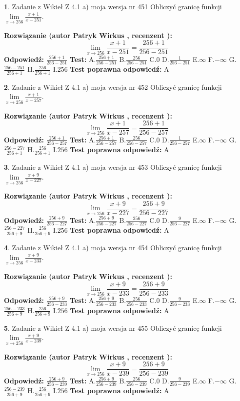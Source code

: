 \documentclass[12pt, a4paper]{article}
\theoremstyle{definition} %
\newtheorem{zad}{}
\newcommand{\zadStart}[1]{\begin{zad}#1\newline}
\newcommand{\zadStop}{\end{zad}}
\newcommand{\rozwStart}[2]{\noindent \textbf{Rozwiązanie (autor #1 , recenzent #2): }\newline}
\newcommand{\rozwStop}{\newline}
\newcommand{\odpStart}{\noindent \textbf{Odpowiedź:}\newline}
\newcommand{\odpStop}{\newline}
\newcommand{\testStart}{\noindent \textbf{Test:}\newline}
\newcommand{\testStop}{\newline}
\newcommand{\kluczStart}{\noindent \textbf{Test poprawna odpowiedź:}\newline}
\newcommand{\kluczStop}{\newline}
\begin{document}
\zadStart{Zadanie z Wikieł Z 4.1 a) moja wersja nr 451}
Obliczyć granicę funkcji $\lim\limits_{x\to256}\frac{x+1}{x-251}$.
\zadStop
\rozwStart{Patryk Wirkus}{}
$$\lim\limits_{x\to256}\frac{x+1}{x-251} = \frac{256+1}{256-251}$$
\rozwStop
\odpStart
$\frac{256+1}{256-251}$
\odpStop
\testStart
A.$\frac{256+1}{256-251}$
B.$\frac{256}{256-251}$
C.$0$
D.$\frac{1}{256-251}$
E.$\infty$
F.$-\infty$
G.$\frac{256-251}{256+1}$
H.$\frac{256}{256+1}$
I.$256$
\testStop
\kluczStart
A
\kluczStop



\zadStart{Zadanie z Wikieł Z 4.1 a) moja wersja nr 452}
Obliczyć granicę funkcji $\lim\limits_{x\to256}\frac{x+1}{x-257}$.
\zadStop
\rozwStart{Patryk Wirkus}{}
$$\lim\limits_{x\to256}\frac{x+1}{x-257} = \frac{256+1}{256-257}$$
\rozwStop
\odpStart
$\frac{256+1}{256-257}$
\odpStop
\testStart
A.$\frac{256+1}{256-257}$
B.$\frac{256}{256-257}$
C.$0$
D.$\frac{1}{256-257}$
E.$\infty$
F.$-\infty$
G.$\frac{256-257}{256+1}$
H.$\frac{256}{256+1}$
I.$256$
\testStop
\kluczStart
A
\kluczStop



\zadStart{Zadanie z Wikieł Z 4.1 a) moja wersja nr 453}
Obliczyć granicę funkcji $\lim\limits_{x\to256}\frac{x+9}{x-227}$.
\zadStop
\rozwStart{Patryk Wirkus}{}
$$\lim\limits_{x\to256}\frac{x+9}{x-227} = \frac{256+9}{256-227}$$
\rozwStop
\odpStart
$\frac{256+9}{256-227}$
\odpStop
\testStart
A.$\frac{256+9}{256-227}$
B.$\frac{256}{256-227}$
C.$0$
D.$\frac{9}{256-227}$
E.$\infty$
F.$-\infty$
G.$\frac{256-227}{256+9}$
H.$\frac{256}{256+9}$
I.$256$
\testStop
\kluczStart
A
\kluczStop



\zadStart{Zadanie z Wikieł Z 4.1 a) moja wersja nr 454}
Obliczyć granicę funkcji $\lim\limits_{x\to256}\frac{x+9}{x-233}$.
\zadStop
\rozwStart{Patryk Wirkus}{}
$$\lim\limits_{x\to256}\frac{x+9}{x-233} = \frac{256+9}{256-233}$$
\rozwStop
\odpStart
$\frac{256+9}{256-233}$
\odpStop
\testStart
A.$\frac{256+9}{256-233}$
B.$\frac{256}{256-233}$
C.$0$
D.$\frac{9}{256-233}$
E.$\infty$
F.$-\infty$
G.$\frac{256-233}{256+9}$
H.$\frac{256}{256+9}$
I.$256$
\testStop
\kluczStart
A
\kluczStop



\zadStart{Zadanie z Wikieł Z 4.1 a) moja wersja nr 455}
Obliczyć granicę funkcji $\lim\limits_{x\to256}\frac{x+9}{x-239}$.
\zadStop
\rozwStart{Patryk Wirkus}{}
$$\lim\limits_{x\to256}\frac{x+9}{x-239} = \frac{256+9}{256-239}$$
\rozwStop
\odpStart
$\frac{256+9}{256-239}$
\odpStop
\testStart
A.$\frac{256+9}{256-239}$
B.$\frac{256}{256-239}$
C.$0$
D.$\frac{9}{256-239}$
E.$\infty$
F.$-\infty$
G.$\frac{256-239}{256+9}$
H.$\frac{256}{256+9}$
I.$256$
\testStop
\kluczStart
A
\kluczStop
\end{document}
